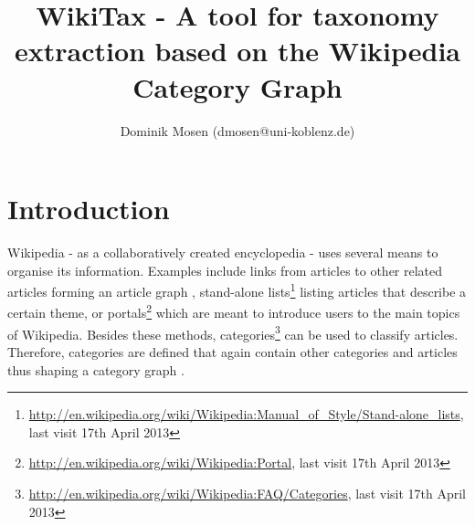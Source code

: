 \documentclass{scrartcl}
\title{WikiTax - A tool for taxonomy extraction based on the Wikipedia Category Graph}
\author{Dominik Mosen (dmosen@uni-koblenz.de)}
\begin{document}
\maketitle


\section{Introduction}
Wikipedia - as a collaboratively created encyclopedia - uses several means to organise its information. Examples include links from articles to other related articles forming an article graph \cite{ZeschGurevych2007analysis}, stand-alone lists\footnote{\url{http://en.wikipedia.org/wiki/Wikipedia:Manual_of_Style/Stand-alone_lists}, last visit 17th April 2013} listing articles that describe a certain theme, or portals\footnote{\url{http://en.wikipedia.org/wiki/Wikipedia:Portal}, last visit 17th April 2013} which are meant to introduce users to the main topics of Wikipedia. Besides these methods, categories\footnote{\url{http://en.wikipedia.org/wiki/Wikipedia:FAQ/Categories}, last visit 17th April 2013} can be used to classify articles. Therefore, categories are defined that again contain other categories and articles thus shaping a category graph \cite{ZeschGurevych2007analysis}. 
\end{document}
